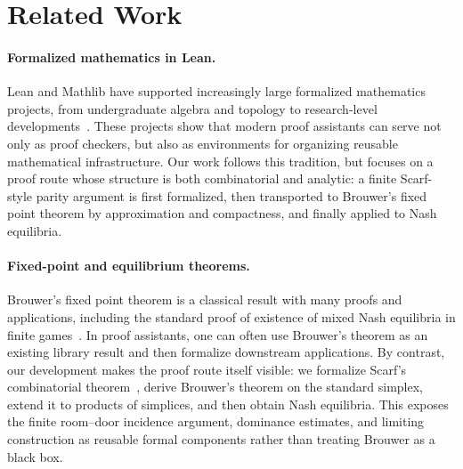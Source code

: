 \documentclass{article}
\theoremstyle{definition}
\begin{document}
\section{Related Work}
\label{sec:related}

\paragraph{Formalized mathematics in Lean.}
Lean and Mathlib have supported increasingly large formalized mathematics
projects, from undergraduate algebra and topology to research-level
developments~\cite{moura2021lean,mathlib2020}.  These projects show that
modern proof assistants can serve not only as proof checkers, but also as
environments for organizing reusable mathematical infrastructure.  Our work
follows this tradition, but focuses on a proof route whose structure is both
combinatorial and analytic: a finite Scarf-style parity argument is first
formalized, then transported to Brouwer's fixed point theorem by approximation
and compactness, and finally applied to Nash equilibria.

\paragraph{Fixed-point and equilibrium theorems.}
Brouwer's fixed point theorem is a classical result with many proofs and
applications, including the standard proof of existence of mixed Nash
equilibria in finite games~\cite{brouwer1911beweis,border1985fixed,nash1950equilibrium}.
In proof assistants, one can often use Brouwer's theorem as an existing library
result and then formalize downstream applications.  By contrast, our
development makes the proof route itself visible: we formalize Scarf's
combinatorial theorem~\cite{scarf1982computation,ivanov2019beyond}, derive
Brouwer's theorem on the standard simplex, extend it to products of simplices,
and then obtain Nash equilibria.  This exposes the finite room--door incidence
argument, dominance estimates, and limiting construction as reusable formal
components rather than treating Brouwer as a black box.
\end{document}
